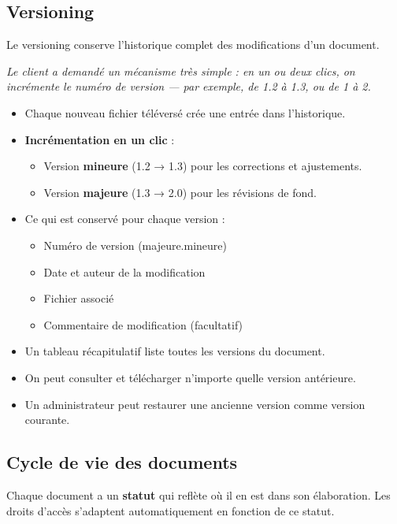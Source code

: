 \documentclass[a4paper,12pt,french]{article}
\begin{document}
\subsection{Versioning}

Le versioning conserve l'historique complet des modifications d'un document.

\textit{Le client a demandé un mécanisme très simple : en un ou deux clics, on incrémente le numéro de version — par exemple, de 1.2 à 1.3, ou de 1 à 2.}

\begin{itemize}[leftmargin=1.5em]
  \item Chaque nouveau fichier téléversé crée une entrée dans l'historique.
  \item \textbf{Incrémentation en un clic} :
    \begin{itemize}
      \item Version \textbf{mineure} (1.2 → 1.3) pour les corrections et ajustements.
      \item Version \textbf{majeure} (1.3 → 2.0) pour les révisions de fond.
    \end{itemize}
  \item Ce qui est conservé pour chaque version :
    \begin{itemize}
      \item Numéro de version (majeure.mineure)
      \item Date et auteur de la modification
      \item Fichier associé
      \item Commentaire de modification (facultatif)
    \end{itemize}
  \item Un tableau récapitulatif liste toutes les versions du document.
  \item On peut consulter et télécharger n'importe quelle version antérieure.
  \item Un administrateur peut restaurer une ancienne version comme version courante.
\end{itemize}

\subsection{Cycle de vie des documents}

Chaque document a un \textbf{statut} qui reflète où il en est dans son élaboration. Les droits d'accès s'adaptent automatiquement en fonction de ce statut.
\end{document}
